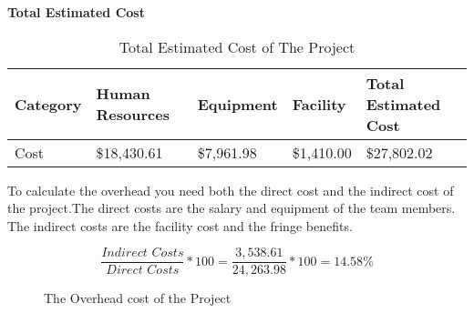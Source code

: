 \begin{table}[H]
    \centering
    \textbf{Total Estimated Cost}
    \begin{tabular}{||m{}|m{}|m{}|m{}|m{}||}
        \hline 
        \rowcolor{cyan}
        Category & Human Resources & Equipment & Facility & Total Estimated Cost\\
        \hline
        \rowcolor{teal}
        Cost & \$18,430.61 & \$7,961.98 & \$1,410.00 & \$27,802.02\\
        \hline
    \end{tabular}
    \caption {Total Estimated Cost of The Project}
       \label{table:6}
\end{table}
To calculate the overhead you need both the direct cost and the indirect cost of the project.The direct costs are the salary and equipment of the team members. The indirect costs are the facility cost and the fringe benefits.\\
\begin{figure}[h]
    $$\frac{\textit{Indirect Costs}}{\textit{Direct Costs}} * 100 = \frac{3,538.61}{24,263.98} * 100 = 14.58\%$$
 \caption{The Overhead cost of the Project}
 \end{figure}